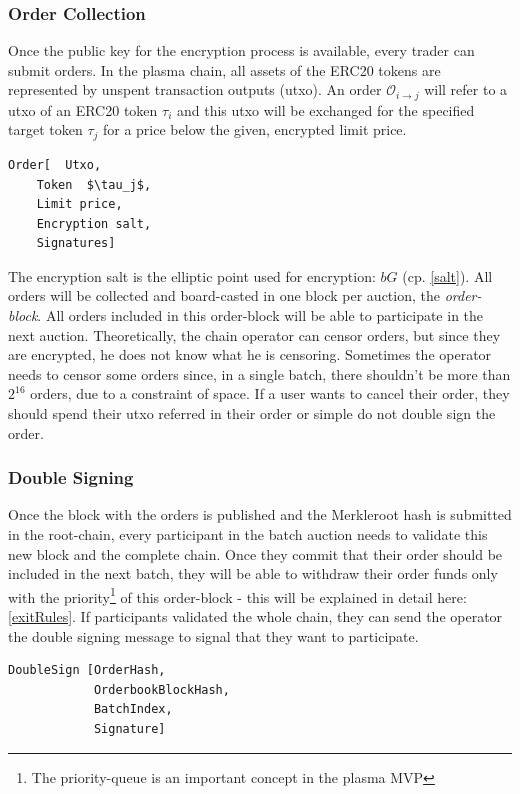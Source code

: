 \documentclass[11pt,parskip=full]{scrartcl}%
\def\pO{\mathcal{O}}
\def\ra{\rightarrow}
\newcommand*{\erc}{ERC20 }
\begin{document}
\subsubsection{Order Collection}
\label{orderblock}
Once the public key for the encryption process is available, every trader can submit orders. 
In the plasma chain, all assets of the ERC20 tokens are represented by unspent transaction outputs (utxo). 
An order $\pO_{i\ra j}$ will refer to a utxo of an \erc token $\tau_i$ and this utxo will be exchanged for the specified target token $\tau_j$ for a price below the given, encrypted limit price. 

\begin{lstlisting}
Order[  Utxo, 
    Token  $\tau_j$,
    Limit price, 
    Encryption salt,
    Signatures]
\end{lstlisting} 
The encryption salt is the elliptic point used for encryption:  $bG$ (cp. \ref{salt}). 
All orders will be collected and board-casted in one block per auction, the \emph{order-block}. 
All orders included in this order-block will be able to participate in the next auction. 
Theoretically, the chain operator can censor orders, but since they are encrypted, he does not know what he is censoring. 
Sometimes the operator needs to censor some orders since, in a single batch, there shouldn't be more than $2^{16}$ orders, due to a constraint of space. 
If a user wants to cancel their order, they should spend their utxo referred in their order or simple do not double sign the order. 

\subsubsection{Double Signing}
Once the block with the orders is published and the Merkleroot hash is submitted in the root-chain, every participant in the batch auction needs to validate this new block and the complete chain. 
Once they commit that their order should be included in the next batch, they will be able to withdraw their order funds only with the priority\footnote{The priority-queue is an important concept in the plasma MVP} of this order-block - this will be explained in detail here: \ref{exitRules}. \newline
If participants validated the whole chain, they can send the operator the double signing message to signal that they want to participate. 
\begin{verbatim}
DoubleSign [OrderHash,
            OrderbookBlockHash,
            BatchIndex,
            Signature]
\end{verbatim}
\end{document}
